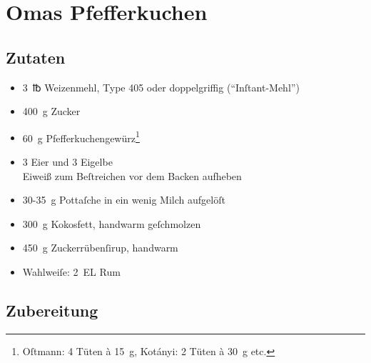 \documentclass[paper=A4,fontsize=12pt,DIV=18,fraktur=false]{rezepte}
\begin{document}
\section*{Omas Pfefferkuchen}

\subsection*{Zutaten}

\begin{itemize}
    \item 3~℔ Weizenmehl, Type 405 oder doppelgriffig (\enquote{Inſtant-Mehl})
    \item 400~g Zucker
    \item 60~g Pfefferkuchengewürz\footnote{Oſtmann: 4 Tüten à 15~g, Kotányi: 2 Tüten à 30~g etc.}
    \item 3 Eier und 3 Eigelbe\\
        Eiweiß zum Beſtreichen vor dem Backen aufheben
    \item 30-35~g Pottaſche in ein wenig Milch aufgelöſt
    \item 300~g Kokosfett, handwarm geſchmolzen
    \item 450~g Zuckerrübenſirup, handwarm
    \item Wahlweiſe: 2~EL Rum
\end{itemize}

\subsection*{Zubereitung}
\end{document}
